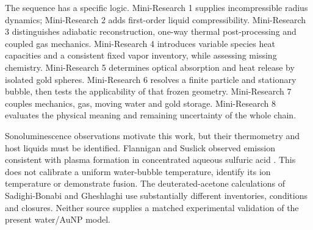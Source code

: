 \documentclass[11pt,a4paper]{article}
\begin{document}
The sequence has a specific logic. Mini-Research 1 supplies incompressible radius dynamics; Mini-Research 2 adds first-order liquid compressibility. Mini-Research 3 distinguishes adiabatic reconstruction, one-way thermal post-processing and coupled gas mechanics. Mini-Research 4 introduces variable species heat capacities and a consistent fixed vapor inventory, while assessing missing chemistry. Mini-Research 5 determines optical absorption and heat release by isolated gold spheres. Mini-Research 6 resolves a finite particle and stationary bubble, then tests the applicability of that frozen geometry. Mini-Research 7 couples mechanics, gas, moving water and gold storage. Mini-Research 8 evaluates the physical meaning and remaining uncertainty of the whole chain.

Sonoluminescence observations motivate this work, but their thermometry and host liquids must be identified. Flannigan and Suslick observed emission consistent with plasma formation in concentrated aqueous sulfuric acid \cite{flannigan}. This does not calibrate a uniform water-bubble temperature, identify its ion temperature or demonstrate fusion. The deuterated-acetone calculations of Sadighi-Bonabi and Gheshlaghi \cite{sadighi} use substantially different inventories, conditions and closures. Neither source supplies a matched experimental validation of the present water/AuNP model.
\clearpage
\end{document}

